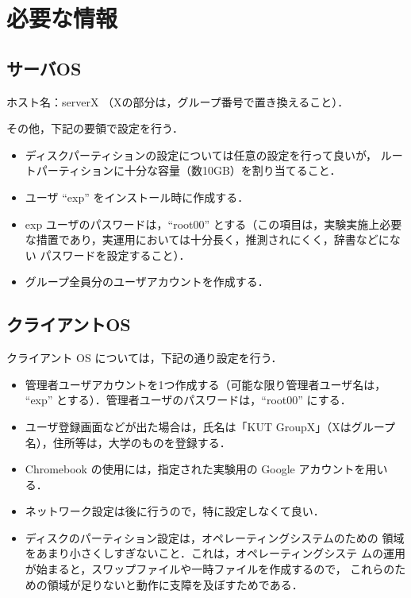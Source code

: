 \section{必要な情報}
\subsection{サーバOS}

ホスト名：serverX  （Xの部分は，グループ番号で置き換えること）．

その他，下記の要領で設定を行う．

\begin{itemize}
 \item ディスクパーティションの設定については任意の設定を行って良いが，
       ルートパーティションに十分な容量（数10GB）を割り当てること．
 \item ユーザ ``exp'' をインストール時に作成する．
 \item exp ユーザのパスワードは，``root00'' とする（この項目は，実験実施上必要
 な措置であり，実運用においては十分長く，推測されにくく，辞書などにない
       パスワードを設定すること）．
 \item グループ全員分のユーザアカウントを作成する．
\end{itemize}

\subsection{クライアントOS}
クライアント OS については，下記の通り設定を行う．

\begin{itemize}
 \item 管理者ユーザアカウントを1つ作成する（可能な限り管理者ユーザ名は，
       ``exp'' とする）．管理者ユーザのパスワードは，``root00'' にする．
 \item ユーザ登録画面などが出た場合は，氏名は「KUT GroupX」（Xはグループ
       名），住所等は，大学のものを登録する．
 \item Chromebook の使用には，指定された実験用の Google アカウントを用いる．
 \item ネットワーク設定は後に行うので，特に設定しなくて良い．
 \item ディスクのパーティション設定は，オペレーティングシステムのための
       領域をあまり小さくしすぎないこと．これは，オペレーティングシステ
       ムの運用が始まると，スワップファイルや一時ファイルを作成するので，
       これらのための領域が足りないと動作に支障を及ぼすためである．
\end{itemize}

